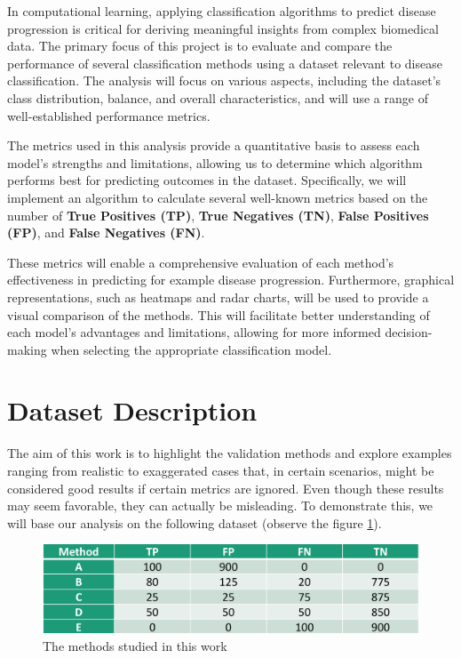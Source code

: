 \documentclass{llncs}
\begin{document}
In computational learning, applying classification algorithms to predict disease progression is critical for deriving meaningful insights from complex biomedical data. The primary focus of this project is to evaluate and compare the performance of several classification methods using a dataset relevant to disease classification. The analysis will focus on various aspects, including the dataset's class distribution, balance, and overall characteristics, and will use a range of well-established performance metrics.

The metrics used in this analysis provide a quantitative basis to assess each model’s strengths and limitations, allowing us to determine which algorithm performs best for predicting outcomes in the dataset. Specifically, we will implement an algorithm to calculate several well-known metrics based on the number of \textbf{True Positives (TP)}, \textbf{True Negatives (TN)}, \textbf{False Positives (FP)}, and \textbf{False Negatives (FN)}. 

These metrics will enable a comprehensive evaluation of each method's effectiveness in predicting for example disease progression. Furthermore, graphical representations, such as heatmaps and radar charts, will be used to provide a visual comparison of the methods. This will facilitate better understanding of each model's advantages and limitations, allowing for more informed decision-making when selecting the appropriate classification model.

\section{Dataset Description}

The aim of this work is to highlight the validation methods and explore examples ranging from realistic to exaggerated cases that, in certain scenarios, might be considered good results if certain metrics are ignored. Even though these results may seem favorable, they can actually be misleading. To demonstrate this, we will base our analysis on the following dataset (observe the figure \ref{fig:dataset}).

\begin{figure}[h!]
	\begin{center}  %
		\includegraphics[width=1\textwidth]{images/dataset.png}
		\caption{The methods studied in this work}
		\label{fig:dataset}
	\end{center}
\end{figure}
\end{document}
